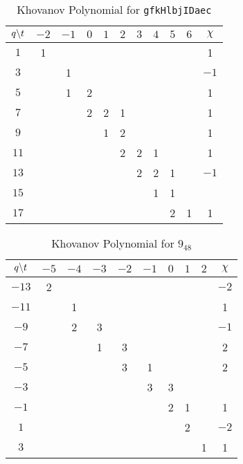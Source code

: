 \begin{table}
    \centering
    \begin{tabular}{| c | c | c | c | c | c | c | c | c | c | c |}
        \hline
        $q\symbol{92}t$&$-2$&$-1$&$0$&$1$&$2$&$3$&$4$&$5$&$6$&$\chi$\\
        \hline
        $1$&1&&&&&&&&&1\\
        \hline
        $3$&&1&&&&&&&&$-1$\\
        \hline
        $5$&&1&2&&&&&&&1\\
        \hline
        $7$&&&2&2&1&&&&&1\\
        \hline
        $9$&&&&1&2&&&&&1\\
        \hline
        $11$&&&&&2&2&1&&&1\\
        \hline
        $13$&&&&&&2&2&1&&$-1$\\
        \hline
        $15$&&&&&&&1&1&&\\
        \hline
        $17$&&&&&&&&2&1&1\\
        \hline
    \end{tabular}
    \caption{Khovanov Polynomial for \texttt{gfkHlbjIDaec}}
\end{table}
\begin{table}
    \centering
    \begin{tabular}{| c | c | c | c | c | c | c | c | c | c |}
        \hline
        $q\symbol{92}t$&$-5$&$-4$&$-3$&$-2$&$-1$&$0$&$1$&$2$&$\chi$\\
        \hline
        $-13$&2&&&&&&&&$-2$\\
        \hline
        $-11$&&1&&&&&&&1\\
        \hline
        $-9$&&2&3&&&&&&$-1$\\
        \hline
        $-7$&&&1&3&&&&&2\\
        \hline
        $-5$&&&&3&1&&&&2\\
        \hline
        $-3$&&&&&3&3&&&\\
        \hline
        $-1$&&&&&&2&1&&1\\
        \hline
        $1$&&&&&&&2&&$-2$\\
        \hline
        $3$&&&&&&&&1&1\\
        \hline
    \end{tabular}
    \caption{Khovanov Polynomial for $9_{48}$}
\end{table}
